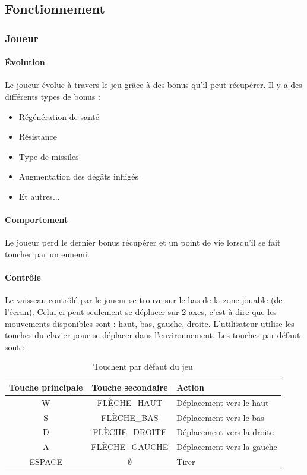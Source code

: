 \documentclass[11pt, a4paper, oneside]{article}
\begin{document}
\subsection{Fonctionnement}
\subsubsection{Joueur}
\paragraph{Évolution}
Le joueur évolue à travers le jeu grâce à des bonus qu'il peut récupérer. Il y a des différents types de bonus :
\begin{itemize}
	\item Régénération de santé
	\item Résistance
	\item Type de missiles
	\item Augmentation des dégâts infligés
	\item Et autres...
\end{itemize}
\paragraph{Comportement}
Le joueur perd le dernier bonus récupérer et un point de vie lorsqu'il se fait toucher par un ennemi.
\paragraph{Contrôle}
Le vaisseau contrôlé par le joueur se trouve sur le bas de la zone jouable (de l'écran). Celui-ci peut seulement se déplacer sur 2 axes, c'est-à-dire que les mouvements disponibles sont : haut, bas, gauche, droite. L'utilisateur utilise les touches du clavier pour se déplacer dans l'environnement. Les touches par défaut sont :
\begin{table}[h]
	\begin{center}
		\begin{tabular}{|c|c|l|}
			\hline
			\textbf{Touche principale} & \textbf{Touche secondaire} & \textbf{Action}\\
			\hline \hline
			W & FLÈCHE\_HAUT & Déplacement vers le haut\\ \hline
			S & FLÈCHE\_BAS & Déplacement vers le bas\\ \hline
			D & FLÈCHE\_DROITE & Déplacement vers la droite\\ \hline
			A & FLÈCHE\_GAUCHE & Déplacement vers la gauche\\ \hline
			ESPACE & $\emptyset$ & Tirer\\
			\hline
		\end{tabular}
		\caption{Touchent par défaut du jeu}
		\label{table:touchesjeu}
	\end{center}
\end{table}
\end{document}
